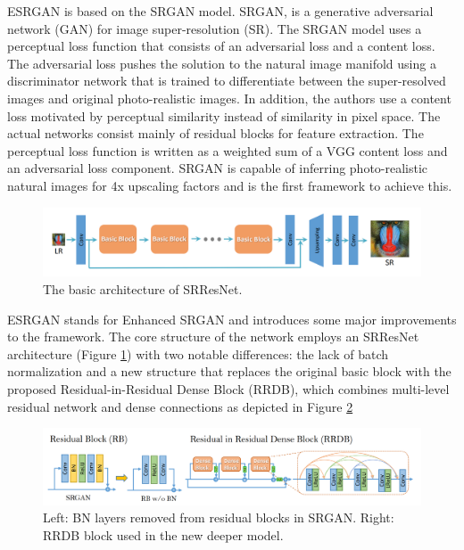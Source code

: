 ESRGAN is based on the SRGAN\cite{ledig2017photorealistic} model. SRGAN, is a generative adversarial network (GAN) for image super-resolution (SR). The SRGAN model uses a perceptual loss function that consists of an adversarial loss and a content loss. The adversarial loss pushes the solution to the natural image manifold using a discriminator network that is trained to differentiate between the super-resolved images and original photo-realistic images. In addition, the authors use a content loss motivated by perceptual similarity instead of similarity in pixel space. The actual networks consist mainly of residual blocks for feature extraction. The perceptual loss function is written as a weighted sum of a VGG content loss and an adversarial loss component. SRGAN is capable of inferring photo-realistic natural images for 4x upscaling factors and is the first framework to achieve this.

\begin{figure}[H]
  \centering
  \includegraphics[scale=0.25]{figures/SRResNet.png}
  \caption{The basic architecture of SRResNet.\cite{wang2018esrgan}}
  \label{img:SRResNet}
\end{figure}

ESRGAN stands for Enhanced SRGAN and introduces some major improvements to the framework. The core structure of the network employs an SRResNet architecture (Figure \ref{img:SRResNet}) with two notable differences: the lack of batch normalization and a new structure that replaces the original basic block with the proposed Residual-in-Residual Dense Block (RRDB), which combines multi-level residual network and dense
connections as depicted in Figure \ref{img:RRDB}

\begin{figure}[H]
  \centering
  \includegraphics[scale=0.25]{figures/RRDB.png}
  \caption{Left: BN layers removed from residual blocks in SRGAN. Right: RRDB block used in the new deeper model.\cite{wang2018esrgan}}
  \label{img:RRDB}
\end{figure}


